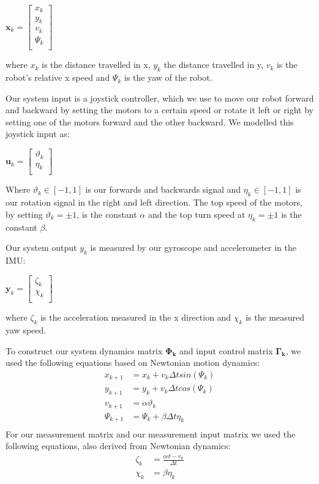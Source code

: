 \documentclass[class=article, crop=false]{standalone}
\begin{document}
\begin{center}
 $\textbf{x}_k =
  \begin{bmatrix}
   x_k    \\
   y_k    \\
   v_k    \\
   \Psi_k \\
  \end{bmatrix}
 $
\end{center}

where $x_k$ is the distance travelled in x, $y_k$ the distance travelled in y, $v_k$ is the robot's relative x speed and $\Psi_k$ is the yaw of the robot.

Our system input is a joystick controller, which we use to move our robot forward and backward by setting the motors to a certain speed or rotate it left or right by setting one of the motors forward and the other backward. We modelled this joystick input as:
\begin{center}
$ \textbf{u}_k =
\begin{bmatrix}
     \vartheta_k \\
     \eta_k    \\
 \end{bmatrix}
$
\end{center}

Where $\vartheta_k \in [-1,1]$ is our forwards and backwards signal and $\eta_k \in [-1,1]$ is our rotation signal in the right and left direction. The top speed of the motors, by setting $\vartheta_k = \pm 1$, is the constant $\alpha$ and the top turn speed at $\eta_k = \pm 1$ is the constant $\beta$.

Our system output $y_k$ is measured by our gyroscope and accelerometer in the IMU:
\begin{center}
 $ \textbf{y}_k =
  \begin{bmatrix}
   \zeta_k \\
   \chi_k  \\
  \end{bmatrix}
 $
\end{center}

where $\zeta_k$ is the acceleration measured in the x direction and $\chi_k$ is the measured yaw speed.

To construct our system dynamics matrix $ \boldsymbol{\Phi_k} $ and input control matrix $ \boldsymbol{\Gamma_k} $, we used the following equations based on Newtonian motion dynamics:
\begin{align*}
    x_{k+1} &= x_k + v_k \Delta t sin(\Psi_k)\\
    y_{k+1} &= y_k + v_k \Delta t cos(\Psi_k)\\
    v_{k+1} &= \alpha \vartheta_k\\
    \Psi_{k+1} &= \Psi_k + \beta \Delta t \eta_k\\
\end{align*}\label{eq:systemdyn}
For our measurement matrix and our measurement input matrix we used the following equations, also derived from Newtonian dynamics:
\begin{align*}
\zeta_k &= \frac{\alpha \vartheta - v_k}{\Delta t}\\
\chi_k &= \beta \eta_k
\end{align*}\label{eq:outdyn}
\end{document}

